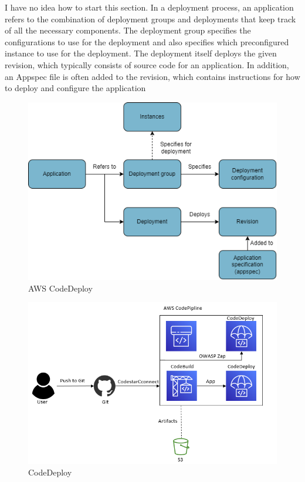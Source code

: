 I have no idea how to start this section.
In a deployment process, an application refers to the combination of deployment groups and deployments that keep track of all the necessary components. The deployment group specifies the configurations to use for the deployment and also specifies which preconfigured instance to use for the deployment. The deployment itself deploys the given revision, which typically consists of source code for an application. In addition, an Appspec file is often added to the revision, which contains instructions for how to deploy and configure the application

\vspace{2mm}
\begin{figure}[H]
    \centering
    \includegraphics[width=0.6\columnwidth]{Images/CodeDeploy.drawio.png}
    \caption{AWS CodeDeploy}
    \label{fig: AWS CodeDeploy}
\end{figure}

\vspace{2mm}
\begin{figure}[H]
    \centering
    \includegraphics[width=0.6\columnwidth]{Images/aws-piplin-4.png}
    \caption{CodeDeploy}
    \label{fig: CodeDeploy}
\end{figure}


